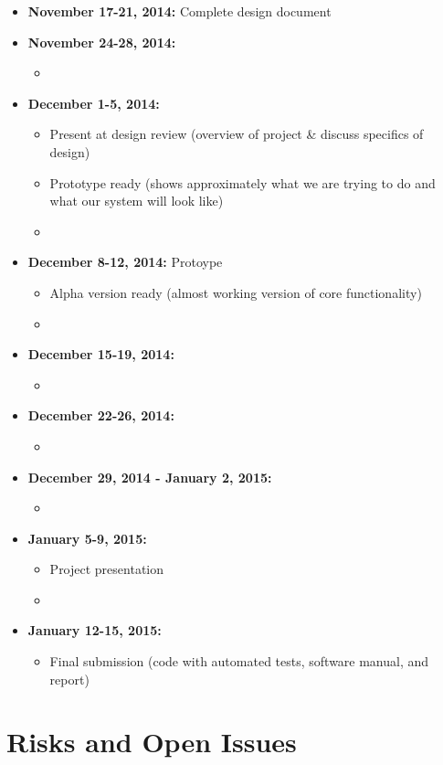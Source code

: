 \documentclass[11pt]{article}
\begin{document}
\begin{itemize}
\item \textbf{November 17-21, 2014:} Complete design document
\item \textbf{November 24-28, 2014:}
  \begin{itemize}
  \item
  \end{itemize}
\item \textbf{December 1-5, 2014:}
  \begin{itemize}
  \item Present at design review (overview of project & discuss specifics of design)
  \item Prototype ready (shows approximately what we are trying to do and what our system will look like)
  \item 
  \end{itemize}
\item \textbf{December 8-12, 2014:} Protoype
  \begin{itemize}
  \item Alpha version ready (almost working version of core functionality)
  \item
  \end{itemize}
\item \textbf{December 15-19, 2014:}
  \begin{itemize}
  \item 
  \end{itemize}
\item \textbf{December 22-26, 2014:}
  \begin{itemize}
  \item
  \end{itemize}
\item \textbf{December 29, 2014 - January 2, 2015:}
  \begin{itemize}
  \item
  \end{itemize}
\item \textbf{January 5-9, 2015:}
  \begin{itemize}
  \item Project presentation
  \item
  \end{itemize}
\item \textbf{January 12-15, 2015:}
  \begin{itemize}
  \item Final submission (code with automated tests, software manual, and report)
  \end{itemize}
\end{itemize}



\section{Risks and Open Issues}

\end{document}
